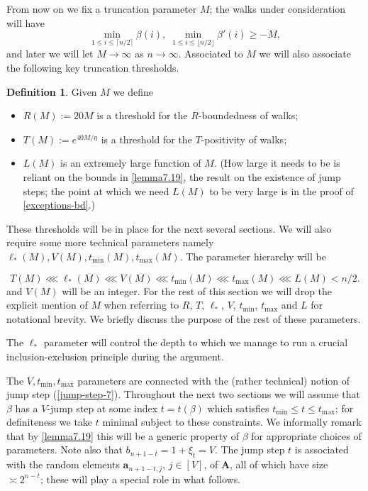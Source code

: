 \documentclass[11pt,reqno]{amsart}
\numberwithin{equation}{section}
\theoremstyle{definition}
\newtheorem{definition}[theorem]{Definition}
\theoremstyle{remark}
\newcommand{\mbf}{\mathbf}
\renewcommand{\le}{\leqslant}
\renewcommand{\ge}{\geqslant}
\begin{document}
 
From now on we fix a truncation parameter $M$; the walks under consideration will have \[ \min_{1 \le i \le \lceil n/2\rceil} \beta(i), \; \min_{1 \le i \le \lfloor n/2\rfloor} \beta'(i) \ge -M,\] and later we will let $M \rightarrow \infty$ as $n \rightarrow \infty$. Associated to $M$ we will also associate the following key truncation thresholds.

\begin{definition}\label{truncation-threshold-defs} Given $M$ we define
\begin{itemize}
\item $R(M) := 20 M$ is a threshold for the $R$-boundedness of walks;
   \item $T(M) := e^{40M/\eta}$ is a threshold for the $T$-positivity of walks;
    \item $L(M)$ is an extremely large function of $M$. (How large it needs to be is reliant on the bounds in \cref{lemma7.19}, the result on the existence of jump steps; the point at which we need $L(M)$ to be very large is in the proof of \cref{exceptions-bd}.)
\end{itemize}
\end{definition}
These thresholds will be in place for the next several sections. We will also require some more technical parameters  namely $\ell_*(M), V(M), t_{\min}(M), t_{\max}(M)$. The parameter hierarchy will be

\begin{equation}\label{param-heir} T(M) \lll \ell_*(M)  \lll V(M) \lll t_{\min}(M) \lll t_{\max}(M) \lll L(M) < n/2.\end{equation}
and $V(M)$ will be an integer. For the rest of this section we will drop the explicit mention of $M$ when referring to $R$, $T$, $\ell_*$, $V$, $t_{\min}$, $t_{\max}$ and $L$ for notational brevity. We briefly discuss the purpose of the rest of these parameters.

The $\ell_*$ parameter will control the depth to which we manage to run a crucial inclusion-exclusion principle during the argument.

The $V, t_{\min}, t_{\max}$ parameters are connected with the (rather technical) notion of jump step (\cref{jump-step-7}). Throughout the next two sections we will assume that $\beta$ has a $V$-jump step at some index $t = t(\beta)$ which satisfies $t_{\min} \le t \le t_{\max}$; for definiteness we take $t$ minimal subject to these constraints. We informally remark that by \cref{lemma7.19} this will be a generic property of $\beta$ for appropriate choices of parameters. Note also that $b_{n + 1 - t} = 1 + \xi_t = V$. The jump step $t$ is associated with the random elements $\mbf{a}_{n + 1 -t,j}$, $j \in [V]$, of $\mbf{A}$, all of which have size $\asymp 2^{n - t}$; these will play a special role in what follows.
\end{document}
